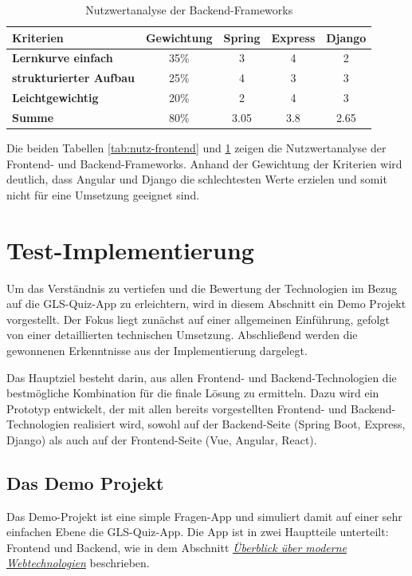 \documentclass[biblatex]{lni}
\begin{document}
\begin{table}[h!]
  \centering
  \caption{Nutzwertanalyse der Backend-Frameworks}
  \label{tab:nutz-backend}
  \begin{tabular}{@{}lcccc@{}}
    \toprule
    \textbf{Kriterien} & \textbf{Gewichtung} & \textbf{Spring} & \textbf{Express} & \textbf{Django} \\ \midrule
    \textbf{Lernkurve einfach} & 35\% & 3 & 4 & 2 \\ \midrule
    \textbf{strukturierter Aufbau} & 25\% & 4 & 3 & 3 \\ \midrule
    \textbf{Leichtgewichtig} & 20\% & 2 & 4 & 3 \\ \midrule
    \textbf{Summe} & 80\% & 3.05 & 3.8 & 2.65 \\ \bottomrule
  \end{tabular}
\end{table}

Die beiden Tabellen \ref{tab:nutz-frontend} und \ref{tab:nutz-backend} zeigen die Nutzwertanalyse der Frontend- und Backend-Frameworks.
Anhand der Gewichtung der Kriterien wird deutlich,
dass Angular und Django die schlechtesten Werte erzielen und somit nicht für eine Umsetzung geeignet sind.

\section{Test-Implementierung}

Um das Verständnis zu vertiefen und die Bewertung der Technologien im Bezug auf die GLS-Quiz-App zu erleichtern,
wird in diesem Abschnitt ein Demo Projekt vorgestellt.
Der Fokus liegt zunächst auf einer allgemeinen Einführung,
gefolgt von einer detaillierten technischen Umsetzung.
Abschließend werden die gewonnenen Erkenntnisse aus der Implementierung dargelegt.

Das Hauptziel besteht darin,
aus allen Frontend- und Backend-Technologien die bestmögliche Kombination für die finale Lösung zu ermitteln.
Dazu wird ein Prototyp entwickelt, der mit allen bereits vorgestellten Frontend- und Backend-Technologien realisiert wird,
sowohl auf der Backend-Seite (Spring Boot, Express, Django) als auch auf der Frontend-Seite (Vue, Angular, React).

\subsection{Das Demo Projekt}

Das Demo-Projekt ist eine simple Fragen-App und simuliert damit auf einer sehr einfachen Ebene die GLS-Quiz-App.
Die App ist in zwei Hauptteile unterteilt: Frontend und Backend, wie in dem Abschnitt \hyperref[sec:moderne-webtechnologien]{\textit{Überblick über moderne Webtechnologien}} beschrieben.
\end{document}
